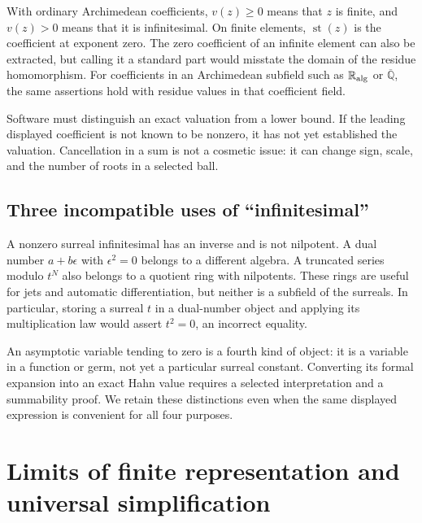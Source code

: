 \documentclass[11pt,letterpaper]{article}
\numberwithin{equation}{section}
\theoremstyle{definition}
\theoremstyle{remark}\newtheorem{remark}[theorem]{Remark}
\newcommand{\RA}{\mathbb R_{\rm alg}}
\newcommand{\CA}{\overline{\mathbb Q}}
\newcommand{\st}{\operatorname{st}}
\begin{document}
With ordinary Archimedean coefficients, $v(z)\ge0$ means that $z$ is finite,
and $v(z)>0$ means that it is infinitesimal. On finite elements,
$\st(z)$ is the coefficient at exponent zero. The zero coefficient of an
infinite element can also be extracted, but calling it a standard part would
misstate the domain of the residue homomorphism. For coefficients in an
Archimedean subfield such as $\RA$ or $\CA$, the same assertions hold with
residue values in that coefficient field.

Software must distinguish an exact valuation from a lower bound. If the
leading displayed coefficient is not known to be nonzero, it has not yet
established the valuation. Cancellation in a sum is not a cosmetic issue:
it can change sign, scale, and the number of roots in a selected ball.

\subsection{Three incompatible uses of ``infinitesimal''}
A nonzero surreal infinitesimal has an inverse and is not nilpotent. A dual
number $a+b\epsilon$ with $\epsilon^2=0$ belongs to a different algebra.
A truncated series modulo $t^N$ also belongs to a quotient ring with
nilpotents. These rings are useful for jets and automatic differentiation,
but neither is a subfield of the surreals. In particular, storing a surreal
$t$ in a dual-number object and applying its multiplication law would assert
$t^2=0$, an incorrect equality.

An asymptotic variable tending to zero is a fourth kind of object: it is a
variable in a function or germ, not yet a particular surreal constant.
Converting its formal expansion into an exact Hahn value requires a selected
interpretation and a summability proof. We retain these distinctions even
when the same displayed expression is convenient for all four purposes.

\section{Limits of finite representation and universal simplification}
\label{sec:limits}
\end{document}

